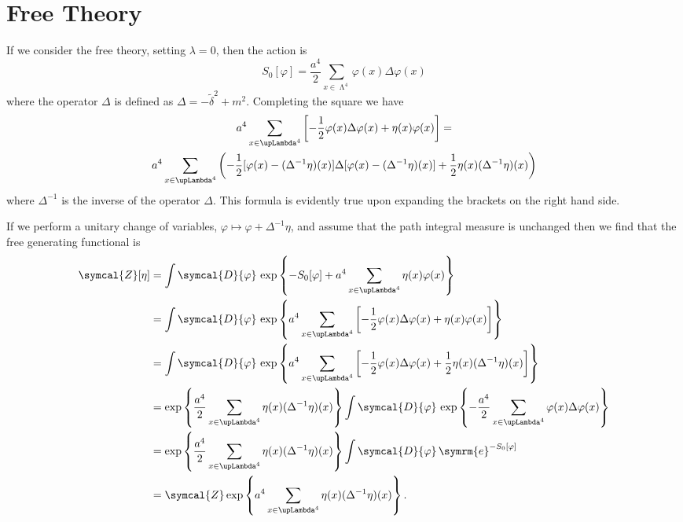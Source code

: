 \documentclass[fleqn]{NotesClass}
\newcommand{\e}{\symrm{e}}
\newcommand{\DL}[1]{\symcal{D}{#1}}
\newcommand{\partitionFunction}{\symcal{Z}}
\newcommand{\lattice}[1][4]{\upLambda^{#1}}
\newcommand{\mixedLaplacian}{{\widetilde{\delta}^2}}
\begin{document}
    \section{Free Theory}
    If we consider the free theory, setting \(\lambda = 0\), then the action is
    \begin{equation}
        S_0[\varphi] = \frac{a^4}{2} \sum_{x\in\lattice} \varphi(x)\Delta\varphi(x)
    \end{equation}
    where the operator \(\Delta\) is defined as \(\Delta = -\mixedLaplacian + m^2\).
    Completing the square we have
    \begin{gather}
        a^4 \sum_{x\in\lattice} \left[ -\frac{1}{2}\varphi(x)\Delta\varphi(x) + \eta(x)\varphi(x) \right] =\\
        a^4 \sum_{x\in\lattice} \left( -\frac{1}{2}[\varphi(x) - (\Delta^{-1}\eta)(x)]\Delta[\varphi(x) - (\Delta^{-1}\eta)(x)] + \frac{1}{2}\eta(x)(\Delta^{-1}\eta)(x) \right) \notag
    \end{gather}
    where \(\Delta^{-1}\) is the inverse of the operator \(\Delta\).
    This formula is evidently true upon expanding the brackets on the right hand side.
    
    If we perform a unitary change of variables, \(\varphi \mapsto \varphi + \Delta^{-1}\eta\), and assume that the path integral measure is unchanged then we find that the free generating functional is
    \begin{align}
        \partitionFunction[\eta] &= \int\DL{\varphi} \, \exp\left\{ -S_0[\varphi] + a^4 \sum_{x\in\lattice} \eta(x)\varphi(x) \right\}\\
        &= \int\DL{\varphi} \, \exp\left\{ a^4 \sum_{x\in\lattice} \left[ -\frac{1}{2}\varphi(x)\Delta\varphi(x) + \eta(x)\varphi(x) \right] \right\}\\
        &= \int\DL{\varphi} \, \exp\left\{ a^4 \sum_{x\in\lattice} \left[ -\frac{1}{2}\varphi(x)\Delta\varphi(x) + \frac{1}{2}\eta(x)(\Delta^{-1}\eta)(x) \right] \right\}\\
        &= \exp\left\{ \frac{a^4}{2}\sum_{x\in\lattice} \eta(x)(\Delta^{-1}\eta)(x) \right\} \int \DL{\varphi} \, \exp\left\{ -\frac{a^4}{2}\sum_{x\in\lattice} \varphi(x)\Delta\varphi(x) \right\} \notag\\
        &= \exp\left\{ \frac{a^4}{2}\sum_{x\in\lattice} \eta(x)(\Delta^{-1}\eta)(x) \right\} \int \DL{\varphi} \, \e^{-S_0[\varphi]}\\
        &= \partitionFunction \exp\left\{ a^4\sum_{x\in\lattice} \eta(x)(\Delta^{-1}\eta)(x) \right\}.
    \end{align}
    
\end{document}
